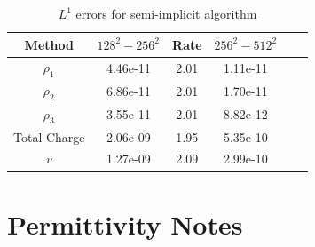 \documentclass[final]{siamltex}
\begin{document}
\begin{table}[htb]
\begin{center}
\caption{$L^1$ errors for semi-implicit algorithm}
\label{tab:semi-implicit convergence}
\begin{tabular}{cccccc}
\\ \hline\hline                                                                 
Method & $128^2-256^2$ & Rate & $256^2-512^2$ \\
\hline\hline
$\rho_1$     & 4.46e-11 & 2.01 & 1.11e-11 \\
$\rho_2$     & 6.86e-11 & 2.01 & 1.70e-11 \\
$\rho_3$     & 3.55e-11 & 2.01 & 8.82e-12 \\
Total Charge & 2.06e-09 & 1.95 & 5.35e-10 \\
$v$          & 1.27e-09 & 2.09 & 2.99e-10 \\
\end{tabular}
\end{center}
\end{table}

\section{Permittivity Notes}
\end{document}
